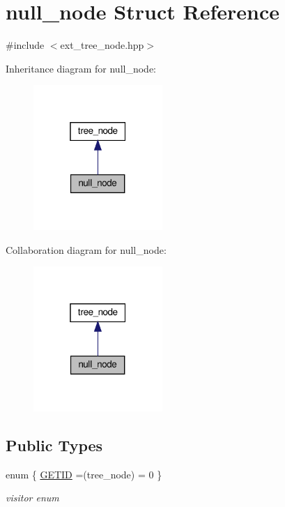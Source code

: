 \hypertarget{structnull__node}{}\section{null\+\_\+node Struct Reference}
\label{structnull__node}


{\ttfamily \#include $<$ext\+\_\+tree\+\_\+node.\+hpp$>$}



Inheritance diagram for null\+\_\+node\+:
\nopagebreak
\begin{figure}[H]
\begin{center}
\leavevmode
\includegraphics[width=139pt]{db/d0f/structnull__node__inherit__graph}
\end{center}
\end{figure}


Collaboration diagram for null\+\_\+node\+:
\nopagebreak
\begin{figure}[H]
\begin{center}
\leavevmode
\includegraphics[width=139pt]{d5/dba/structnull__node__coll__graph}
\end{center}
\end{figure}
\subsection*{Public Types}
\begin{DoxyCompactItemize}
\item 
enum \{ \hyperlink{structnull__node_a9473c0148b56f703975a2af958325928a79a3bf9c6634c93e7fa168b80eea2d51}{G\+E\+T\+ID} =(tree\+\_\+node) = 0
 \}\begin{DoxyCompactList}\small\item\em visitor enum \end{DoxyCompactList}
\end{DoxyCompactItemize}
